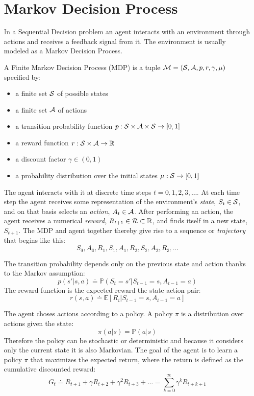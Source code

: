 \section{Markov Decision Process}
In a Sequential Decision problem an agent interacts with an environment through actions and receives a feedback signal from it.
The environment is usually modeled as a Markov Decision Process.
\\
\begin{definition}
A Finite Markov Decision Process (MDP) is a tuple $\mathcal{M} = (\mathcal{S}, \mathcal{A}, p, r, \gamma, \mu)$ specified by:
\begin{itemize}
    \item a finite set $\mathcal{S}$ of possible states
    \item a finite set $\mathcal{A}$ of actions
    \item a transition probability function $p: \mathcal{S} \times \mathcal{A} \times \mathcal{S} \to [0, 1]$
    \item a reward function $r: \mathcal{S} \times \mathcal{A} \to \mathbb{R} $
    \item a discount factor $\gamma \in (0,1)$
    \item a probability distribution over the initial states $\mu: \mathcal{S} \to [0, 1]$

\end{itemize}
\end{definition}

The agent interacts with it at discrete time steps $t = 0,1,2,3,\dots$.
At each time step the agent receives some representation of the environment's \textit{state}, $S_t \in \mathcal{S}$, and on that basis
selects an \textit{action}, $A_t \in \mathcal{A}$. After performing an action, the agent receives a numerical \textit{reward}, $R_{t+1} \in \mathcal{R} \subset \mathbb{R}$,
and finds itself in a new state, $S_{t+1}$. The MDP and agent together thereby give rise to a sequence or \textit{trajectory} that begins like this:
\[ S_0, A_0, R_1, S_1, A_1, R_2, S_2, A_2, R_3, \dots\]

The transition probability depends only on the previous state and action thanks to the Markov assumption:
\[p(s'|s,a) \doteq \mathbb{P}(S_t = s' | S_{t-1}=s, A_{t-1}=a)\]
The reward function is the expected reward the state action pair:
\[r(s,a) \doteq \mathbb{E}[R_t | S_{t-1} = s, A_{t-1} = a]\]

The agent choses actions according to a policy. A policy $\pi$ is a distribution over actions given the state:
\[\pi(a|s)=\mathbb{P}(a|s)\]
Therefore the policy can be stochastic or deterministic and because it considers only the current state it is also Markovian.
The goal of the agent is to learn a policy $\pi$ that maximizes the expected return, where the return is defined as the cumulative discounted reward:
\[G_t \doteq R_{t+1} + \gamma R_{t+2} + \gamma^2 R_{t+3} + \dots = \sum_{k=0}^{\infty}\gamma^k R_{t+k+1}\]

